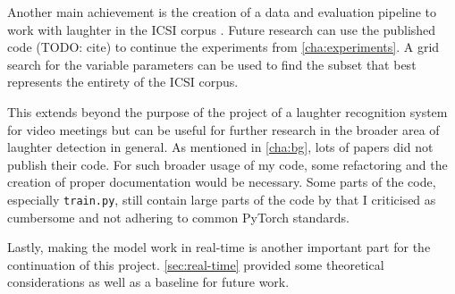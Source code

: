 \documentclass[bsc,frontabs,parskip,deptreport]{infthesis}
\begin{document}
Another main achievement is the creation of a data and evaluation pipeline to work with laughter in the ICSI corpus \citep{morgan2001meeting}. 
Future research can use the published code (TODO: cite) to continue the experiments from \autoref{cha:experiments}. A grid search for the variable parameters can be used to find the subset that best represents the entirety of the ICSI corpus. 

This extends beyond the purpose of the project of a laughter recognition system for video meetings but can be useful for further research in the broader area of laughter detection in general. 
As mentioned in \autoref{cha:bg}, lots of papers did not publish their code.
For such broader usage of my code, some refactoring and the creation of proper documentation would be necessary.
Some parts of the code, especially \verb|train.py|, still contain large parts of the code by \citet{gillick2021robust} that I criticised as cumbersome and not adhering to common PyTorch standards. 

Lastly, making the model work in real-time is another important part for the continuation of this project. \autoref{sec:real-time} provided some theoretical considerations as well as a baseline for future work.


\end{document}
